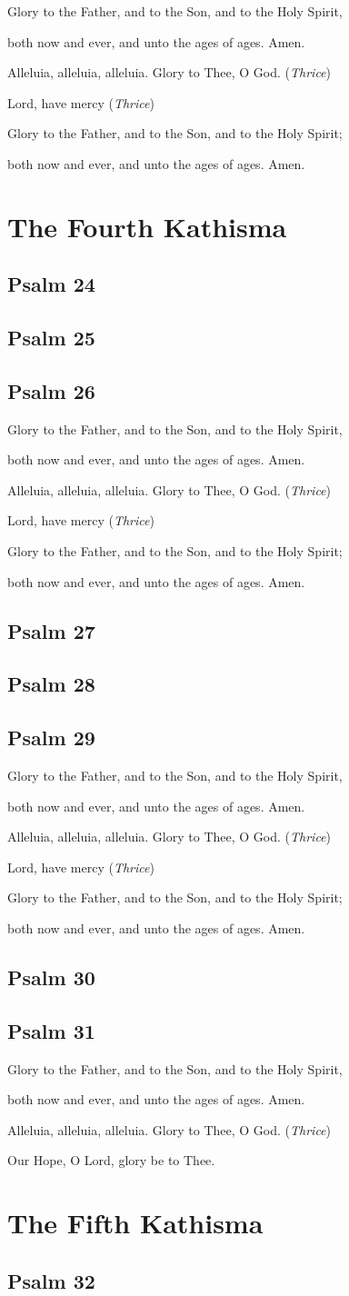 \documentclass[12pt,openany]{book}
\newcommand{\kathismabreak}{
  \medskip
  \begin{center}
  \begin{footnotesize}
  Glory to the Father, and to the Son, and to the Holy Spirit,
  
  both now and ever, and unto the ages of ages. Amen.

  Alleluia, alleluia, alleluia. Glory to Thee, O God. (\textit{Thrice})

  Lord, have mercy (\textit{Thrice})

  Glory to the Father, and to the Son, and to the Holy Spirit;
  
  both now and ever, and unto the ages of ages. Amen.
  \end{footnotesize}
  \end{center}
  \smallbreak
}
\newcommand{\kathismaend}{
  \medskip
  \begin{center}
  \begin{footnotesize}
  Glory to the Father, and to the Son, and to the Holy Spirit,
  
  both now and ever, and unto the ages of ages. Amen.

  Alleluia, alleluia, alleluia. Glory to Thee, O God. (\textit{Thrice})

  Our Hope, O Lord, glory be to Thee.
  \end{footnotesize}
  \end{center}
  \smallbreak
}
\begin{document}
\kathismabreak

\chapter*{The Fourth Kathisma}
\smallskip
\section{Psalm 24}

\smallskip
\section{Psalm 25}

\smallskip
\section{Psalm 26}


\kathismabreak
\smallskip

\section{Psalm 27}

\medskip
\section{Psalm 28}

\medskip
\section{Psalm 29}

\smallbreak

\pagebreak %
\kathismabreak
\smallskip

\section{Psalm 30}

\smallskip
\section{Psalm 31}


\kathismaend

\chapter*{The Fifth Kathisma}
\smallskip
\section{Psalm 32}

\smallskip
\end{document}

